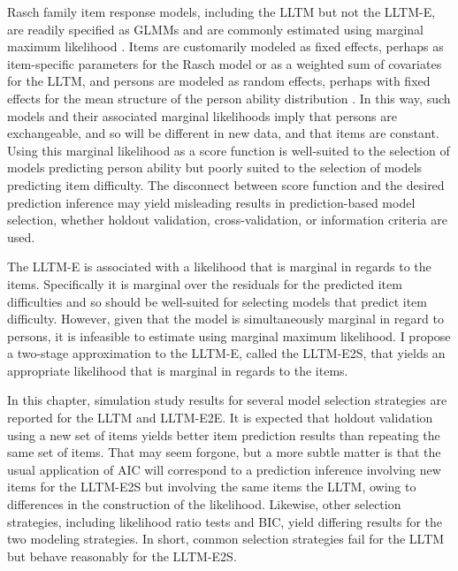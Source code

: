 Rasch family item response models, including the LLTM but not the LLTM-E, are readily specified as GLMMs \parencite{Rijmen2003} and are commonly estimated using marginal maximum likelihood \parencite{Bock1981}. Items are customarily modeled as fixed effects, perhaps as item-specific parameters for the Rasch model or as a weighted sum of covariates for the LLTM, and persons are modeled as random effects, perhaps with fixed effects for the mean structure of the person ability distribution \parencite[for example,][]{Adams1997b}. In this way, such models and their associated marginal likelihoods imply that persons are exchangeable, and so will be different in new data, and that items are constant. Using this marginal likelihood as a score function is well-suited to the selection of models predicting person ability but poorly suited to the selection of models predicting item difficulty. The disconnect between score function and the desired prediction inference may yield misleading results in prediction-based model selection, whether holdout validation, cross-validation, or information criteria are used.

The LLTM-E is associated with a likelihood that is marginal in regards to the items. Specifically it is marginal over the residuals for the predicted item difficulties and so should be well-suited for selecting models that predict item difficulty. However, given that the model is simultaneously marginal in regard to persons, it is infeasible to estimate using marginal maximum likelihood. I propose a two-stage approximation to the LLTM-E, called the LLTM-E2S, that yields an appropriate likelihood that is marginal in regards to the items.

In this chapter, simulation study results for several model selection strategies are reported for the LLTM and LLTM-E2E.  It is expected that holdout validation using a new set of items yields better item prediction results than repeating the same set of items. That may seem forgone, but a more subtle matter is that the usual application of AIC will correspond to a prediction inference involving new items for the LLTM-E2S but involving the same items the LLTM, owing to differences in the construction of the likelihood. Likewise, other selection strategies, including likelihood ratio tests and BIC, yield differing results for the two modeling strategies. In short, common selection strategies fail for the LLTM but behave reasonably for the LLTM-E2S.


